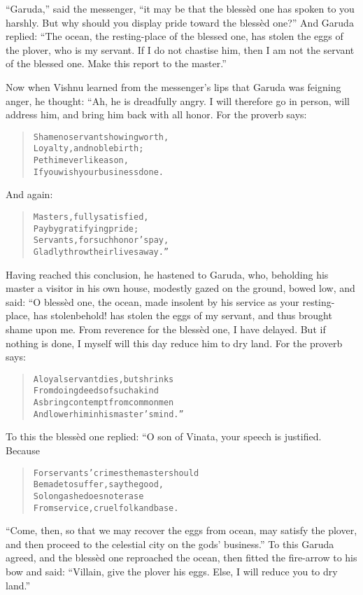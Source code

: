 \documentclass[article, twoside, 14pt]{memoir}
\renewenvironment{verbatim}{%
\begin{quote}%
\vskip -10pt%
\begin{alltt}\normalfont\large}{\end{alltt}%
\end{quote}%
\vskip -10pt
} %
\begin{document}
``Garuda,'' said the messenger,
``it may be that the blessèd one has spoken to you harshly. But why should you display pride toward the blessèd one?''
And Garuda replied:
``The ocean, the resting-place of the blessed one, has stolen the eggs of the plover, who is my servant. If I do not chastise him, then I am not the servant of the blessed one. Make this report to the master.''

Now when Vishnu learned from the messenger's lips that Garuda was
feigning anger, he thought: “Ah, he is dreadfully angry. I will
therefore go in person, will address him, and bring him back with
all honor. For the proverb says:

\begin{verbatim}
Shame no servant showing worth,
Loyalty, and noble birth;
Pet him ever like a son,
If you wish your business done.
\end{verbatim}
And again:

\begin{verbatim}
Masters, fully satisfied,
Pay by gratifying pride;
Servants, for such honor's pay,
Gladly throw their lives away.”
\end{verbatim}
Having reached this conclusion, he hastened to Garuda, who,
beholding his master a visitor in his own house, modestly gazed on
the ground, bowed low, and said: “O blessèd one, the ocean, made
insolent by his service as your resting-place, has stolen{\textemdash}behold!
has stolen the eggs of my servant, and thus brought shame upon me.
From reverence for the blessèd one, I have delayed. But if nothing
is done, I myself will this day reduce him to dry land. For the
proverb says:

\begin{verbatim}
A loyal servant dies, but shrinks
    From doing deeds of such a kind
As bring contempt from common men
    And lower him in his master's mind.”
\end{verbatim}
To this the blessèd one replied: “O son of Vinata, your speech is
justified. Because

\begin{verbatim}
For servants' crimes the master should
Be made to suffer, say the good,
So long as he does not erase
From service, cruel folk and base.
\end{verbatim}
``Come, then, so that we may recover the eggs from ocean, may satisfy the plover, and then proceed to the celestial city on the gods' business.''
To this Garuda agreed, and the blessèd one reproached the ocean,
then fitted the fire-arrow to his bow and said:
``Villain, give the plover his eggs. Else, I will reduce you to dry land.''
\end{document}
